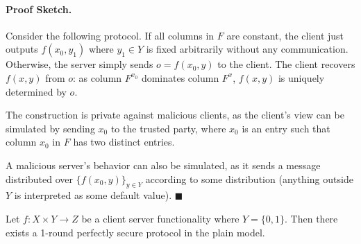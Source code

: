 \documentclass{llncs}
\newcommand{\bnote}[1]{\authnote{Bar}{#1}}
\begin{document}
{\paragraph{Proof Sketch.} Consider the following protocol.
If all columns in $F$ are constant, the client just outputs $f(x_0,y_1)$ where $y_1\in Y$ is fixed arbitrarily without any communication. Otherwise, the server simply sends $o=f(x_0,y)$ to the client.
The client recovers $f(x,y)$ from $o$: as column $F^{x_0}$ dominates 
column $F^x$, $f(x,y)$ is uniquely determined by $o$.

The construction is private against malicious clients, as the client's view can be simulated by sending $x_0$ to the trusted party, where $x_0$ is an entry such that column $x_0$ in $F$ has two distinct entries.

A malicious server's behavior can also be simulated, as it sends a message distributed over $\{f(x_0,y)\}_{y\in Y}$ according to some distribution (anything outside $Y$ is interpreted as some default value). \hspace*{385pt}$\blacksquare$ 


\begin{corollary}
	Let $f:X\times Y\rightarrow Z$ be a client server functionality where $Y=\{0,1\}$. Then there exists a 1-round perfectly secure protocol in the plain model.
\end{corollary}

}

\end{document}
